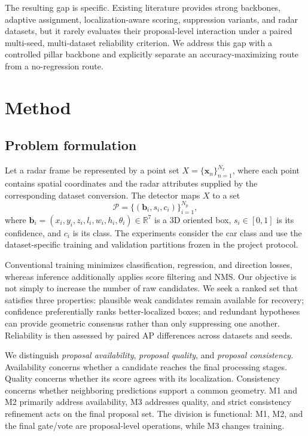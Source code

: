 \documentclass[preprint,12pt,times]{elsarticle}
\begin{document}
The resulting gap is specific. Existing literature provides strong backbones,
adaptive assignment, localization-aware scoring, suppression variants, and
radar datasets, but it rarely evaluates their proposal-level interaction under
a paired multi-seed, multi-dataset reliability criterion. We address this gap
with a controlled pillar backbone and explicitly separate an accuracy-maximizing
route from a no-regression route.

\section{Method}

\subsection{Problem formulation}

Let a radar frame be represented by a point set
$X=\{\mathbf{x}_n\}_{n=1}^{N_x}$, where each point contains spatial
coordinates and the radar attributes supplied by the corresponding dataset
conversion. The detector maps $X$ to a set
\begin{equation}
\mathcal{P}=\{(\mathbf{b}_i,s_i,c_i)\}_{i=1}^{N_p},
\end{equation}
where $\mathbf{b}_i=(x_i,y_i,z_i,l_i,w_i,h_i,\theta_i)\in\mathbb{R}^7$
is a 3D oriented box, $s_i\in[0,1]$ is its confidence, and $c_i$ is its
class. The experiments consider the car class and use the dataset-specific
training and validation partitions frozen in the project protocol.

Conventional training minimizes classification, regression, and direction
losses, whereas inference additionally applies score filtering and NMS. Our
objective is not simply to increase the number of raw candidates. We seek a
ranked set that satisfies three properties: plausible weak candidates remain
available for recovery; confidence preferentially ranks better-localized
boxes; and redundant hypotheses can provide geometric consensus rather than
only suppressing one another. Reliability is then assessed by paired AP
differences across datasets and seeds.

We distinguish \emph{proposal availability}, \emph{proposal quality}, and
\emph{proposal consistency}. Availability concerns whether a candidate reaches
the final processing stages. Quality concerns whether its score agrees with
its localization. Consistency concerns whether neighboring predictions support
a common geometry. M1 and M2 primarily address availability, M3 addresses
quality, and strict consistency refinement acts on the final proposal set.
The division is functional: M1, M2, and the final gate/vote are proposal-level
operations, while M3 changes training.
\end{document}
